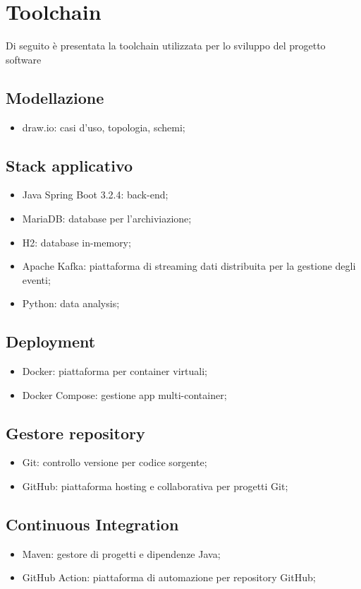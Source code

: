 \section{Toolchain}
Di seguito è presentata la toolchain utilizzata per lo sviluppo del progetto software
\subsection{Modellazione}
\begin{itemize}
	\item draw.io: casi d’uso, topologia, schemi;
\end{itemize}

\subsection{Stack applicativo}
\begin{itemize}
	\item Java Spring Boot 3.2.4: back-end;
	\item MariaDB: database per l’archiviazione;
	\item H2: database in-memory;
	\item Apache Kafka: piattaforma di streaming dati distribuita per la gestione degli eventi;
	\item Python: data analysis;
\end{itemize}

\subsection{Deployment}
\begin{itemize}
	\item Docker: piattaforma per container virtuali;
	\item Docker Compose: gestione app multi-container;
\end{itemize}

\subsection{Gestore repository}
\begin{itemize}
	\item Git: controllo versione per codice sorgente;
	\item GitHub: piattaforma hosting e collaborativa per progetti Git;
\end{itemize}

\subsection{Continuous Integration}
\begin{itemize}
	\item Maven: gestore di progetti e dipendenze Java;
	\item GitHub Action: piattaforma di automazione per repository GitHub;
\end{itemize}


